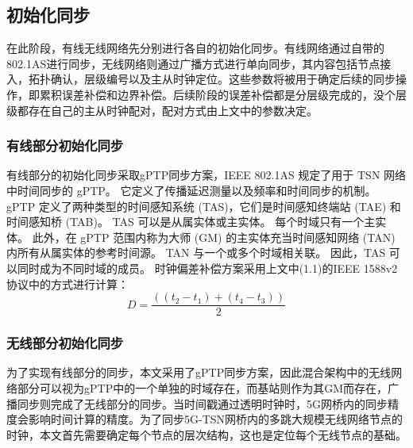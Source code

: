 \documentclass[UTF8,a4paper,12pt]{ctexart}
\numberwithin{equation}{section}
\begin{document}
\begin{figure}[htb]
\end{figure}

\subsection{初始化同步}

在此阶段，有线无线网络先分别进行各自的初始化同步。有线网络通过自带的802.1AS进行同步，无线网络则通过广播方式进行单向同步，其内容包括节点接入，拓扑确认，层级编号以及主从时钟定位。这些参数将被用于确定后续的同步操作，即累积误差补偿和边界补偿。后续阶段的误差补偿都是分层级完成的，没个层级都存在自己的主从时钟配对，配对方式由上文中的参数决定。
\subsubsection{有线部分初始化同步}

有线部分的初始化同步采取gPTP同步方案，IEEE 802.1AS 规定了用于 TSN 网络中时间同步的 gPTP。 它定义了传播延迟测量以及频率和时间同步的机制。 gPTP 定义了两种类型的时间感知系统 (TAS)，它们是时间感知终端站 (TAE) 和时间感知桥 (TAB)。 TAS 可以是从属实体或主实体。 每个时域只有一个主实体。 此外，在 gPTP 范围内称为大师 (GM) 的主实体充当时间感知网络 (TAN) 内所有从属实体的参考时间源。 TAN 与一个或多个时域相关联。 因此，TAS 可以同时成为不同时域的成员。
时钟偏差补偿方案采用上文中(1.1)的IEEE 1588v2协议中的方式进行计算：
\begin{equation}
	D = \frac{((t_2-t_1)+(t_4-t_3))}{2} 
\end{equation}
\subsubsection{无线部分初始化同步}
为了实现有线部分的同步，本文采用了gPTP同步方案，因此混合架构中的无线网络部分可以视为gPTP中的一个单独的时域存在，而基站则作为其GM而存在，广播同步则完成了无线部分的同步。当时间戳通过透明时钟时，5G网桥内的同步精度会影响时间计算的精度。为了同步5G-TSN网桥内的多跳大规模无线网络节点的时钟，本文首先需要确定每个节点的层次结构，这也是定位每个无线节点的基础。
\end{document}
